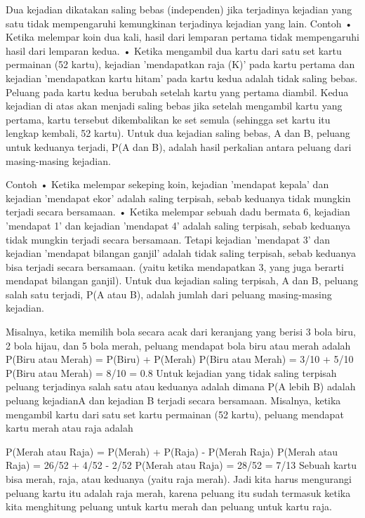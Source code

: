 \documentclass[11pt,fleqn]{book} %
\begin{document}
{{Dua kejadian dikatakan saling bebas (independen) jika terjadinya kejadian yang satu tidak mempengaruhi kemungkinan terjadinya kejadian yang lain.
Contoh
•	Ketika melempar koin dua kali, hasil dari lemparan pertama tidak mempengaruhi hasil dari lemparan kedua.
•	Ketika mengambil dua kartu dari satu set kartu permainan (52 kartu), kejadian 'mendapatkan raja (K)' pada kartu pertama dan kejadian 'mendapatkan kartu hitam' pada kartu kedua adalah tidak saling bebas. Peluang pada kartu kedua berubah setelah kartu yang pertama diambil. Kedua kejadian di atas akan menjadi saling bebas jika setelah mengambil kartu yang pertama, kartu tersebut dikembalikan ke set semula (sehingga set kartu itu lengkap kembali, 52 kartu).
Untuk dua kejadian saling bebas, A dan B, peluang untuk keduanya terjadi, P(A dan B), adalah hasil perkalian antara peluang dari masing-masing kejadian.

Contoh
•	Ketika melempar sekeping koin, kejadian 'mendapat kepala' dan kejadian 'mendapat ekor' adalah saling terpisah, sebab keduanya tidak mungkin terjadi secara bersamaan.
•	Ketika melempar sebuah dadu bermata 6, kejadian 'mendapat 1' dan kejadian 'mendapat 4' adalah saling terpisah, sebab keduanya tidak mungkin terjadi secara bersamaan. Tetapi kejadian 'mendapat 3' dan kejadian 'mendapat bilangan ganjil' adalah tidak saling terpisah, sebab keduanya bisa terjadi secara bersamaan. (yaitu ketika mendapatkan 3, yang juga berarti mendapat bilangan ganjil).
Untuk dua kejadian saling terpisah, A dan B, peluang salah satu terjadi, P(A atau B), adalah jumlah dari peluang masing-masing kejadian.

Misalnya, ketika memilih bola secara acak dari keranjang yang berisi 3 bola biru, 2 bola hijau, dan 5 bola merah, peluang mendapat bola biru atau merah adalah
P(Biru atau Merah) = P(Biru) + P(Merah)
P(Biru atau Merah) = 3/10 + 5/10
P(Biru atau Merah) = 8/10 = 0.8
Untuk kejadian yang tidak saling terpisah peluang terjadinya salah satu atau keduanya adalah
dimana P(A lebih B) adalah peluang kejadianA dan kejadian B terjadi secara bersamaan.
Misalnya, ketika mengambil kartu dari satu set kartu permainan (52 kartu), peluang mendapat kartu merah atau raja adalah

P(Merah atau Raja) = P(Merah) + P(Raja) - P(Merah  Raja)
P(Merah atau Raja) = 26/52 + 4/52 - 2/52
P(Merah atau Raja) = 28/52 = 7/13
Sebuah kartu bisa merah, raja, atau keduanya (yaitu raja merah). Jadi kita harus mengurangi peluang kartu itu adalah raja merah, karena peluang itu sudah termasuk ketika kita menghitung peluang untuk kartu merah dan peluang untuk kartu raja.

}}
\end{document}
